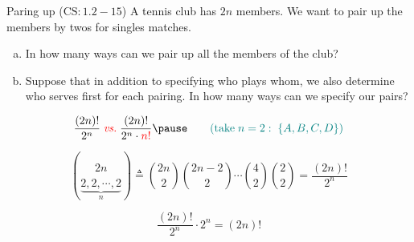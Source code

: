 
\begin{frame}{}
  \begin{exampleblock}{Paring up ($\text{CS}: 1.2-15$)}
    A tennis club has $2n$ members. 
    We want to pair up the members by twos for singles matches. 
    
    \begin{enumerate}[(a)]
      \item In how many ways can we pair up all the members of the club? 
      \item Suppose that in addition to specifying who plays whom, 
	we also determine who serves first for each pairing. 
	In how many ways can we specify our pairs?
    \end{enumerate}
  \end{exampleblock}

  \pause
  \[
    \frac{(2n)!}{2^{n}} \;\red{\text{\emph{vs.}}}\; \frac{(2n)!}{2^n \cdot \red{n!}} \pause \qquad \teal{(\text{take}\; n = 2:\; \set{A, B, C, D})}
  \]

  \pause
  \[
    \binom{2n}{\underbrace{2,2,\cdots,2}_{n}} \triangleq \binom{2n}{2} \binom{2n-2}{2} \cdots \binom{4}{2} \binom{2}{2} = \frac{(2n)!}{2^{n}}
  \]

  \pause
  \[
    \frac{(2n)!}{2^{n}} \cdot 2^n = (2n)!
  \]
\end{frame}

